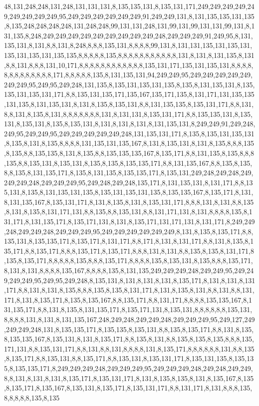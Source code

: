 48,131,248,248,131,248,131,131,131,8,135,135,131,8,135,131,171,249,249,249,249,249,249,249,249,249,95,249,249,249,249,249,249,91,249,249,131,8,131,135,135,131,135,8,135,248,248,248,248,131,248,248,99,131,131,248,131,99,131,99,131,131,99,131,8,131,135,8,248,249,249,249,249,249,249,249,249,249,248,249,249,249,91,249,95,8,131,135,131,8,131,8,8,131,8,248,8,8,8,135,131,8,8,8,8,99,131,8,131,131,135,131,135,131,135,131,135,131,135,135,8,8,8,8,8,135,8,8,8,8,8,8,8,8,8,8,8,131,8,131,8,131,135,8,131,8,8,131,8,8,8,131,10,171,8,8,8,8,8,8,8,8,8,8,8,8,135,131,171,135,131,135,131,8,8,8,8,8,8,8,8,8,8,8,8,8,171,8,8,8,8,8,135,8,131,135,131,94,249,249,95,249,249,249,249,249,249,249,95,249,95,249,248,131,135,8,135,131,135,131,135,8,135,8,131,135,131,8,135,135,131,135,131,171,8,8,135,131,135,171,135,167,135,171,135,8,131,171,131,135,135,131,135,8,131,135,131,8,131,8,135,8,135,131,8,8,131,135,135,8,135,131,171,8,8,131,8,8,131,8,135,8,131,8,8,8,8,8,8,8,131,8,131,131,8,135,131,171,8,8,135,135,131,8,135,131,8,135,131,8,135,8,135,131,8,131,8,131,8,131,8,131,135,131,8,249,249,91,249,248,249,95,249,249,95,249,249,249,249,249,248,131,135,131,171,8,135,8,135,131,135,131,8,135,8,131,8,135,8,8,8,8,131,135,131,135,167,8,131,8,135,131,8,131,8,135,8,8,8,135,8,135,8,8,135,135,8,131,8,135,8,8,135,135,135,167,8,135,171,8,8,131,135,8,135,8,8,8,135,8,8,135,131,8,135,131,8,135,8,135,8,135,135,171,8,8,131,135,167,8,8,135,8,135,8,8,135,8,131,135,171,8,135,8,131,135,8,135,135,171,8,135,131,249,248,249,248,249,249,249,248,249,249,249,95,249,248,249,248,135,171,8,131,135,131,8,131,171,8,8,135,131,8,135,8,131,135,131,135,8,135,131,135,131,135,8,135,135,167,8,135,171,8,131,8,131,135,167,8,135,131,171,8,131,8,135,8,131,8,135,131,171,8,8,8,131,8,131,8,8,135,8,131,8,135,8,131,171,131,8,8,135,8,8,135,131,8,8,131,171,131,8,131,8,8,8,8,135,8,131,171,8,131,135,171,8,135,171,131,8,131,8,135,171,131,171,131,8,131,171,8,249,249,248,249,249,248,249,249,249,95,249,249,249,249,249,249,8,131,8,135,8,135,171,8,8,135,131,8,135,135,171,8,135,171,8,131,171,8,8,171,8,131,8,131,171,8,8,131,8,135,8,135,171,8,8,135,171,8,8,8,135,171,8,135,171,8,8,8,131,8,131,8,8,135,8,135,8,131,171,8,135,8,135,171,8,8,8,8,8,135,8,8,8,135,171,8,8,8,8,135,8,135,131,8,135,8,8,8,135,171,8,131,8,131,8,8,8,8,135,167,8,8,8,8,135,8,131,135,249,249,249,248,249,249,95,249,249,249,249,95,249,95,249,248,8,135,131,8,131,8,131,8,131,8,135,171,8,131,8,131,8,131,171,8,8,131,8,131,8,135,8,8,8,135,8,135,8,131,171,8,131,8,135,8,131,8,8,131,8,8,131,171,8,131,8,135,171,8,135,8,135,167,8,8,135,171,8,8,131,171,8,8,8,8,135,135,167,8,131,135,171,8,8,131,8,135,8,131,135,171,8,135,171,131,8,135,131,8,8,8,8,8,8,135,131,8,8,8,8,131,8,131,8,131,135,167,248,249,248,249,249,248,249,249,249,95,249,127,249,249,249,248,131,8,135,135,171,8,135,135,8,135,131,8,8,135,8,135,171,8,8,131,8,135,8,135,135,167,8,135,131,8,131,8,135,171,8,8,135,8,131,8,8,135,8,135,8,135,8,8,8,135,171,131,8,8,135,131,171,8,8,131,8,8,131,8,8,8,8,131,8,135,171,8,8,8,8,8,8,131,8,8,135,8,135,171,8,8,135,131,8,8,135,171,8,8,135,131,8,135,131,171,8,135,131,135,8,135,135,8,135,135,171,8,249,249,249,248,249,249,249,95,249,249,249,248,249,248,249,249,8,8,131,8,131,8,131,8,135,171,8,135,131,171,8,131,8,135,8,135,8,131,8,135,167,8,135,8,135,171,8,135,167,8,135,131,8,135,171,8,135,131,171,8,8,131,171,8,131,8,8,8,135,8,8,8,8,8,135,8,135